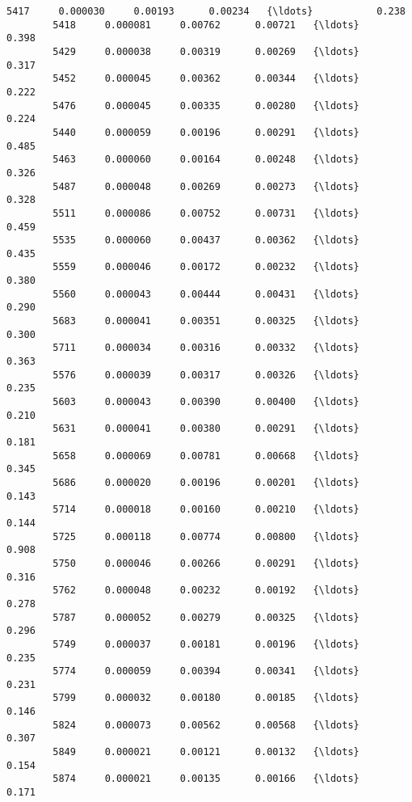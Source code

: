 \documentclass[11pt]{article}
\begin{document}
\begin{Verbatim}[commandchars=\\\{\}]
        5417     0.000030     0.00193      0.00234   {\ldots}           0.238   
        5418     0.000081     0.00762      0.00721   {\ldots}           0.398   
        5429     0.000038     0.00319      0.00269   {\ldots}           0.317   
        5452     0.000045     0.00362      0.00344   {\ldots}           0.222   
        5476     0.000045     0.00335      0.00280   {\ldots}           0.224   
        5440     0.000059     0.00196      0.00291   {\ldots}           0.485   
        5463     0.000060     0.00164      0.00248   {\ldots}           0.326   
        5487     0.000048     0.00269      0.00273   {\ldots}           0.328   
        5511     0.000086     0.00752      0.00731   {\ldots}           0.459   
        5535     0.000060     0.00437      0.00362   {\ldots}           0.435   
        5559     0.000046     0.00172      0.00232   {\ldots}           0.380   
        5560     0.000043     0.00444      0.00431   {\ldots}           0.290   
        5683     0.000041     0.00351      0.00325   {\ldots}           0.300   
        5711     0.000034     0.00316      0.00332   {\ldots}           0.363   
        5576     0.000039     0.00317      0.00326   {\ldots}           0.235   
        5603     0.000043     0.00390      0.00400   {\ldots}           0.210   
        5631     0.000041     0.00380      0.00291   {\ldots}           0.181   
        5658     0.000069     0.00781      0.00668   {\ldots}           0.345   
        5686     0.000020     0.00196      0.00201   {\ldots}           0.143   
        5714     0.000018     0.00160      0.00210   {\ldots}           0.144   
        5725     0.000118     0.00774      0.00800   {\ldots}           0.908   
        5750     0.000046     0.00266      0.00291   {\ldots}           0.316   
        5762     0.000048     0.00232      0.00192   {\ldots}           0.278   
        5787     0.000052     0.00279      0.00325   {\ldots}           0.296   
        5749     0.000037     0.00181      0.00196   {\ldots}           0.235   
        5774     0.000059     0.00394      0.00341   {\ldots}           0.231   
        5799     0.000032     0.00180      0.00185   {\ldots}           0.146   
        5824     0.000073     0.00562      0.00568   {\ldots}           0.307   
        5849     0.000021     0.00121      0.00132   {\ldots}           0.154   
        5874     0.000021     0.00135      0.00166   {\ldots}           0.171   
        

\end{Verbatim}
\end{document}
